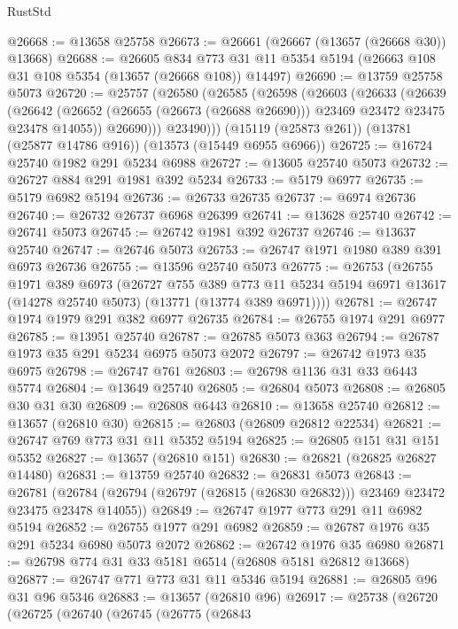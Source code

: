 \begin{lexlean}{RustStd}
\begin{coremodule}
@26668 := @13658 @25758
@26673 := @26661 (@26667 (@13657 (@26668 @30)) @13668)
@26688 := @26605
    @834
    @773
    @31
    @11
    @5354
    @5194
    (@26663 @108 @31 @108 @5354 (@13657 (@26668 @108)) @14497)
@26690 := @13759 @25758 @5073
@26720 := @25757
    (@26580
      (@26585
        (@26598
          (@26603
            (@26633
              (@26639
                (@26642
                  (@26652 (@26655 (@26673 (@26688 @26690))) @23469 @23472 @23475 @23478 @14055))
                @26690)))
          @23490)))
    (@15119 (@25873 @261))
    (@13781 (@25877 @14786 @916))
    (@13573 (@15449 @6955 @6966))
@26725 := @16724 @25740 @1982 @291 @5234 @6988
@26727 := @13605 @25740 @5073
@26732 := @26727 @884 @291 @1981 @392 @5234
@26733 := @5179 @6977
@26735 := @5179 @6982 @5194
@26736 := @26733 @26735
@26737 := @6974 @26736
@26740 := @26732 @26737 @6968 @26399
@26741 := @13628 @25740
@26742 := @26741 @5073
@26745 := @26742 @1981 @392 @26737
@26746 := @13637 @25740
@26747 := @26746 @5073
@26753 := @26747 @1971 @1980 @389 @391 @6973 @26736
@26755 := @13596 @25740 @5073
@26775 := @26753
    (@26755
      @1971
      @389
      @6973
      (@26727
        @755
        @389
        @773
        @11
        @5234
        @5194
        @6971
        @13617
        (@14278 @25740 @5073)
        (@13771 (@13774 @389 @6971))))
@26781 := @26747 @1974 @1979 @291 @382 @6977 @26735
@26784 := @26755 @1974 @291 @6977
@26785 := @13951 @25740
@26787 := @26785 @5073 @363
@26794 := @26787 @1973 @35 @291 @5234 @6975 @5073 @2072
@26797 := @26742 @1973 @35 @6975
@26798 := @26747 @761
@26803 := @26798 @1136 @31 @33 @6443 @5774
@26804 := @13649 @25740
@26805 := @26804 @5073
@26808 := @26805 @30 @31 @30
@26809 := @26808 @6443
@26810 := @13658 @25740
@26812 := @13657 (@26810 @30)
@26815 := @26803 (@26809 @26812 @22534)
@26821 := @26747 @769 @773 @31 @11 @5352 @5194
@26825 := @26805 @151 @31 @151 @5352
@26827 := @13657 (@26810 @151)
@26830 := @26821 (@26825 @26827 @14480)
@26831 := @13759 @25740
@26832 := @26831 @5073
@26843 := @26781
    (@26784 (@26794 (@26797 (@26815 (@26830 @26832))) @23469 @23472 @23475 @23478 @14055))
@26849 := @26747 @1977 @773 @291 @11 @6982 @5194
@26852 := @26755 @1977 @291 @6982
@26859 := @26787 @1976 @35 @291 @5234 @6980 @5073 @2072
@26862 := @26742 @1976 @35 @6980
@26871 := @26798 @774 @31 @33 @5181 @6514 (@26808 @5181 @26812 @13668)
@26877 := @26747 @771 @773 @31 @11 @5346 @5194
@26881 := @26805 @96 @31 @96 @5346
@26883 := @13657 (@26810 @96)
@26917 := @25738
    (@26720
      (@26725
        (@26740
          (@26745
            (@26775
              (@26843

\end{coremodule}
\end{lexlean}
